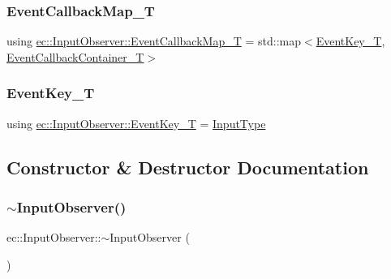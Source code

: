 \mbox{\label{classec_1_1_input_observer_a1edd527067831ae67c3c929c32d62071}} 
\subsubsection{\texorpdfstring{Event\+Callback\+Map\+\_\+T}{EventCallbackMap\_T}}
{\footnotesize\ttfamily using \mbox{\hyperlink{classec_1_1_input_observer_a1edd527067831ae67c3c929c32d62071}{ec\+::\+Input\+Observer\+::\+Event\+Callback\+Map\+\_\+T}} =  std\+::map$<$\mbox{\hyperlink{namespaceec_a5de6bdb8c4b2ed6e590e721ec998f964}{Event\+Key\+\_\+T}}, \mbox{\hyperlink{classec_1_1_input_observer_a4c09afb629f4cfa2cf769957431ebea0}{Event\+Callback\+Container\+\_\+T}}$>$}

\mbox{\label{classec_1_1_input_observer_a17892355c418b93d6f20aafff3767ea2}} 
\subsubsection{\texorpdfstring{Event\+Key\+\_\+T}{EventKey\_T}}
{\footnotesize\ttfamily using \mbox{\hyperlink{namespaceec_a5de6bdb8c4b2ed6e590e721ec998f964}{ec\+::\+Input\+Observer\+::\+Event\+Key\+\_\+T}} =  \mbox{\hyperlink{namespaceec_a5de6bdb8c4b2ed6e590e721ec998f964}{Input\+Type}}}



\subsection{Constructor \& Destructor Documentation}
\mbox{\label{classec_1_1_input_observer_ad6e40c0099cf4fe7aa9a54ef30e12046}} 
\subsubsection{\texorpdfstring{$\sim$\+Input\+Observer()}{~InputObserver()}}
{\footnotesize\ttfamily ec\+::\+Input\+Observer\+::$\sim$\+Input\+Observer (\begin{DoxyParamCaption}{ }\end{DoxyParamCaption})\hspace{0.3cm}{\ttfamily [virtual]}}

